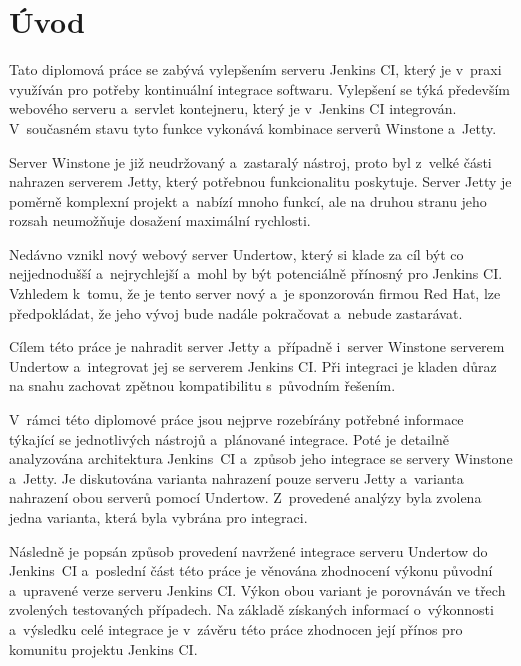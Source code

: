 
\chapter{Úvod}
    Tato diplomová práce se zabývá vylepšením serveru Jenkins CI, který je v~praxi využíván pro potřeby  
    kontinuální integrace softwaru. Vylepšení se týká především webového serveru a~servlet kontejneru, který je v~Jenkins CI integrován. 
    V~současném stavu tyto funkce vykonává kombinace serverů Winstone a~Jetty. 
        
    Server Winstone je již neudržovaný a~zastaralý nástroj, proto
    byl z~velké části nahrazen serverem Jetty, který potřebnou funkcionalitu poskytuje. Server Jetty je poměrně komplexní projekt a~nabízí
    mnoho funkcí, ale na druhou stranu jeho rozsah neumožňuje dosažení maximální rychlosti.
    
    Nedávno vznikl nový webový server Undertow, který si klade za cíl být co nejjednodušší a~nejrychlejší a~mohl by být potenciálně přínosný
    pro Jenkins CI. Vzhledem k~tomu, že je tento server nový a~je sponzorován firmou Red Hat, lze předpokládat, že jeho vývoj
    bude nadále pokračovat a~nebude zastarávat.

    Cílem této práce je nahradit server Jetty a~případně i~server Winstone serverem Undertow 
    a~integrovat jej se serverem Jenkins CI. Při integraci je kladen důraz na snahu
    zachovat zpětnou kompatibilitu s~původním řešením. 

    V~rámci této diplomové práce jsou nejprve rozebírány potřebné informace týkající se jednotlivých nástrojů a~plánované integrace.
    Poté je detailně analyzována architektura Jenkins~CI a~způsob jeho integrace se servery Winstone a~Jetty. 
    Je diskutována varianta nahrazení pouze serveru Jetty a~varianta nahrazení obou serverů pomocí Undertow. 
    Z~provedené analýzy byla zvolena jedna varianta, která byla vybrána pro integraci. 

    Následně je popsán způsob provedení navržené integrace serveru Undertow do Jenkins~CI
    a~poslední část této práce je věnována zhodnocení výkonu původní a~upravené verze serveru Jenkins CI. Výkon
    obou variant je porovnáván ve třech zvolených testovaných případech. Na základě získaných informací o~výkonnosti 
    a~výsledku celé integrace je
v~závěru této práce zhodnocen její přínos pro komunitu projektu Jenkins CI.

